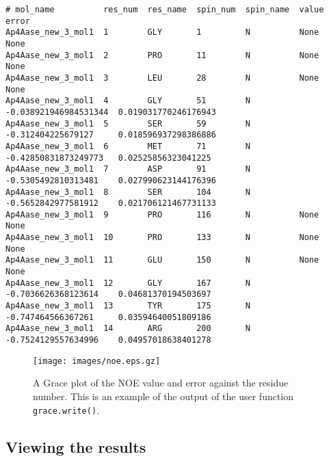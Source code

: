 {\scriptsize \begin{verbatim}
# mol_name          res_num  res_name  spin_num  spin_name  value                  error                   
Ap4Aase_new_3_mol1  1        GLY       1         N          None                   None                    
Ap4Aase_new_3_mol1  2        PRO       11        N          None                   None                    
Ap4Aase_new_3_mol1  3        LEU       28        N          None                   None                    
Ap4Aase_new_3_mol1  4        GLY       51        N          -0.038921946984531344  0.019031770246176943    
Ap4Aase_new_3_mol1  5        SER       59        N          -0.312404225679127     0.018596937298386886    
Ap4Aase_new_3_mol1  6        MET       71        N          -0.42850831873249773   0.02525856323041225     
Ap4Aase_new_3_mol1  7        ASP       91        N          -0.5305492810313481    0.027990623144176396    
Ap4Aase_new_3_mol1  8        SER       104       N          -0.5652842977581912    0.021706121467731133    
Ap4Aase_new_3_mol1  9        PRO       116       N          None                   None                    
Ap4Aase_new_3_mol1  10       PRO       133       N          None                   None                    
Ap4Aase_new_3_mol1  11       GLU       150       N          None                   None                    
Ap4Aase_new_3_mol1  12       GLY       167       N          -0.7036626368123614    0.04681370194503697     
Ap4Aase_new_3_mol1  13       TYR       175       N          -0.747464566367261     0.03594640051809186     
Ap4Aase_new_3_mol1  14       ARG       200       N          -0.7524129557634996    0.04957018638401278     
\end{verbatim}}




\begin{figure}
\centerline{\texttt{[image: images/noe.eps.gz]}}
\caption[NOE plot]{A Grace plot of the NOE value and error against the residue number.  This is an example of the output of the user function \texttt{grace.write()}.}\label{fig: NOE plot}
\end{figure}


\subsection{Viewing the results}


